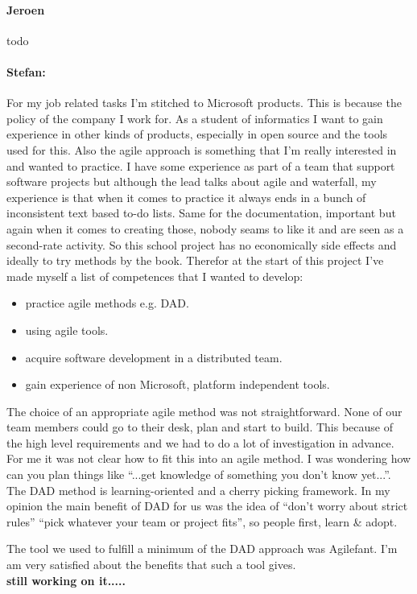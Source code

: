 \paragraph{Jeroen}
todo \\ 

\paragraph{Stefan: }
For my job related tasks I'm stitched to Microsoft products. This is because the
policy of the company I work for. As a student of informatics I want to gain
experience in other kinds of products, especially in open source and the tools
used for this. Also the agile approach is something that I'm really interested
in and wanted to practice. I have some experience as part of a team that support
software projects but although the lead talks about agile and waterfall, my
experience is that when it comes to practice it always ends in a bunch of
inconsistent text based to-do lists. Same for the documentation, important but
again when it comes to creating those, nobody seams to like it and are seen as a
second-rate activity. So this school project has no economically side effects
and ideally to try methods by the book. Therefor at the start of this project
I've made myself a list of competences that I wanted to develop:
\begin{itemize}
 \item practice agile methods e.g. DAD.
 \item using agile tools.
 \item acquire software development in a distributed team.
 \item gain experience of non Microsoft, platform independent tools.
\end{itemize}

The choice of an appropriate agile method was not straightforward. None of our
team members could go to their desk, plan and start to build. This because of
the high level requirements and we had to do a lot of investigation in advance.
For me it was not clear how to fit this into an agile method. I was wondering
how can you plan things like ``...get knowledge of something you don't know
yet...''. The DAD method is learning-oriented and a cherry picking framework. In
my opinion the main benefit of DAD for us was the idea of ``don't worry about
strict rules'' ``pick whatever your team or project fits'', so people first,
learn \& adopt.

The tool we used to fulfill a minimum of the DAD approach was Agilefant.
I'm am very satisfied about the benefits that such a tool gives. 
\\
\textbf{still working on it.....}
